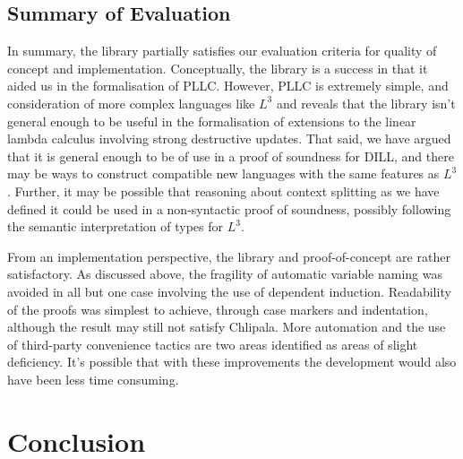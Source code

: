 \documentclass[]{unswthesis}
\newcommand{\SSPHS}{\text{SSPHS }}
\begin{document}
\section{Summary of Evaluation}

In summary, the library partially satisfies our evaluation criteria for quality of concept and implementation. Conceptually, the library is a success in that it aided us in the formalisation of PLLC. However, PLLC is extremely simple, and consideration of more complex languages like $L^3$ and \SSPHS reveals that the library isn't general enough to be useful in the formalisation of extensions to the linear lambda calculus involving strong destructive updates. That said, we have argued that it is general enough to be of use in a proof of soundness for DILL, and there may be ways to construct compatible new languages with the same features as $L^3$. Further, it may be possible that reasoning about context splitting as we have defined it could be used in a non-syntactic proof of soundness, possibly following the semantic interpretation of types for $L^3$.

From an implementation perspective, the library and proof-of-concept are rather satisfactory. As discussed above, the fragility of automatic variable naming was avoided in all but one case involving the use of dependent induction. Readability of the proofs was simplest to achieve, through case markers and indentation, although the result may still not satisfy Chlipala. More automation and the use of third-party convenience tactics are two areas identified as areas of slight deficiency. It's possible that with these improvements the development would also have been less time consuming.



\chapter{Conclusion}
\end{document}
